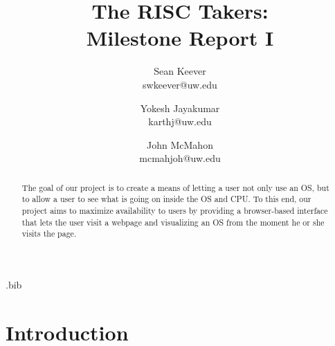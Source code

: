 \usepackage{filecontents}

\usepackage{graphicx}
\usepackage{float}
\graphicspath{ {../images/}}

\begin{filecontents}{\jobname.bib}

\end{filecontents}



\date{}

\title{\Large \bf The RISC Takers:\\
  Milestone Report I}

\author{
  {\rm Sean Keever} \\
  swkeever@uw.edu
  \and
  {\rm Yokesh Jayakumar} \\
  karthj@uw.edu
  \and
  {\rm John McMahon} \\
  mcmahjoh@uw.edu
} %

\maketitle

\begin{abstract}
  The goal of our project is to create a means of letting a user not only use an OS,
  but to allow a user to see what is going on inside the OS and CPU.
  To this end, our project aims to maximize availability to users by
  providing a browser-based interface that lets the user visit a webpage and
  visualizing an OS from the moment he or she visits the page.
\end{abstract}

\section{Introduction}

